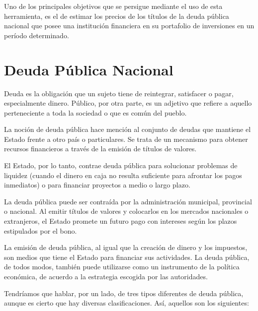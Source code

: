\hspace*{0.4 cm} Uno de los principales objetivos que se persigue mediante el uso de esta herramienta, es el de estimar los precios de los t\'itulos de la deuda p\'ublica nacional que posee una instituci\'on financiera en su portafolio de inversiones en un per\'iodo determinado. 


\section{Deuda P\'ublica Nacional}

\hspace*{0.4 cm} Deuda es la obligaci\'on que un sujeto tiene de reintegrar, satisfacer o pagar, especialmente dinero. P\'ublico, por otra parte, es un adjetivo que refiere a aquello perteneciente a toda la sociedad o que es com\'un del pueblo.

\hspace*{0.4 cm} La noci\'on de deuda p\'ublica hace menci\'on al conjunto de deudas que mantiene el Estado frente a otro pa\'is o particulares. Se trata de un mecanismo para obtener recursos financieros a trav\'es de la emisi\'on de t\'itulos de valores.

\hspace*{0.4 cm} El Estado, por lo tanto, contrae deuda p\'ublica para solucionar problemas de liquidez (cuando el dinero en caja no resulta suficiente para afrontar los pagos inmediatos) o para financiar proyectos a medio o largo plazo.

\hspace*{0.4 cm} La deuda p\'ublica puede ser contra\'ida por la administraci\'on municipal, provincial o nacional. Al emitir t\'itulos de valores y colocarlos en los mercados nacionales o extranjeros, el Estado promete un futuro pago con intereses según los plazos estipulados por el bono.

\hspace*{0.4 cm} La emisi\'on de deuda p\'ublica, al igual que la creaci\'on de dinero y los impuestos, son medios que tiene el Estado para financiar sus actividades. La deuda p\'ublica, de todos modos, tambi\'en puede utilizarse como un instrumento de la pol\'itica econ\'omica, de acuerdo a la estrategia escogida por las autoridades.

\hspace*{0.4 cm} Tendr\'iamos que hablar, por un lado, de tres tipos diferentes de deuda p\'ublica, aunque es cierto que hay diversas clasificaciones. As\'i, aquellos son los siguientes:

